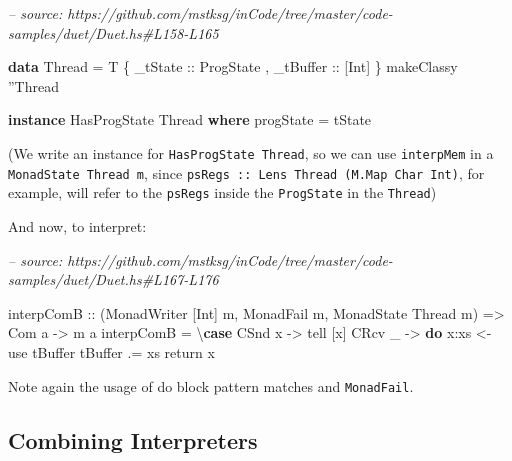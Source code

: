 \documentclass[]{article}
\newenvironment{Shaded}{}{}
\newcommand{\CommentTok}[1]{\textcolor[rgb]{0.38,0.63,0.69}{\textit{#1}}}
\newcommand{\DataTypeTok}[1]{\textcolor[rgb]{0.56,0.13,0.00}{#1}}
\newcommand{\FunctionTok}[1]{\textcolor[rgb]{0.02,0.16,0.49}{#1}}
\newcommand{\KeywordTok}[1]{\textcolor[rgb]{0.00,0.44,0.13}{\textbf{#1}}}
\newcommand{\NormalTok}[1]{#1}
\newcommand{\OtherTok}[1]{\textcolor[rgb]{0.00,0.44,0.13}{#1}}
\begin{document}
\begin{Shaded}
\begin{Highlighting}[]
\CommentTok{-- source: https://github.com/mstksg/inCode/tree/master/code-samples/duet/Duet.hs#L158-L165}

\KeywordTok{data} \DataTypeTok{Thread} \FunctionTok{=} \DataTypeTok{T}
\NormalTok{    \{}\OtherTok{ _tState   ::} \DataTypeTok{ProgState}
\NormalTok{    ,}\OtherTok{ _tBuffer  ::}\NormalTok{ [}\DataTypeTok{Int}\NormalTok{]}
\NormalTok{    \}}
\NormalTok{makeClassy ''}\DataTypeTok{Thread}

\KeywordTok{instance} \DataTypeTok{HasProgState} \DataTypeTok{Thread} \KeywordTok{where}
\NormalTok{    progState }\FunctionTok{=}\NormalTok{ tState}
\end{Highlighting}
\end{Shaded}

(We write an instance for \texttt{HasProgState\ Thread}, so we can use
\texttt{interpMem} in a \texttt{MonadState\ Thread\ m}, since
\texttt{psRegs\ ::\ Lens\textquotesingle{}\ Thread\ (M.Map\ Char\ Int)}, for
example, will refer to the \texttt{psRegs} inside the \texttt{ProgState} in the
\texttt{Thread})

And now, to interpret:

\begin{Shaded}
\begin{Highlighting}[]
\CommentTok{-- source: https://github.com/mstksg/inCode/tree/master/code-samples/duet/Duet.hs#L167-L176}

\NormalTok{interpComB}
\OtherTok{    ::}\NormalTok{ (}\DataTypeTok{MonadWriter}\NormalTok{ [}\DataTypeTok{Int}\NormalTok{] m, }\DataTypeTok{MonadFail}\NormalTok{ m, }\DataTypeTok{MonadState} \DataTypeTok{Thread}\NormalTok{ m)}
    \OtherTok{=>} \DataTypeTok{Com}\NormalTok{ a}
    \OtherTok{->}\NormalTok{ m a}
\NormalTok{interpComB }\FunctionTok{=}\NormalTok{ \textbackslash{}}\KeywordTok{case}
    \DataTypeTok{CSnd}\NormalTok{ x }\OtherTok{->}\NormalTok{ tell [x]}
    \DataTypeTok{CRcv}\NormalTok{ _ }\OtherTok{->} \KeywordTok{do}
\NormalTok{      x}\FunctionTok{:}\NormalTok{xs }\OtherTok{<-}\NormalTok{ use tBuffer}
\NormalTok{      tBuffer }\FunctionTok{.=}\NormalTok{ xs}
\NormalTok{      return x}
\end{Highlighting}
\end{Shaded}

Note again the usage of do block pattern matches and \texttt{MonadFail}.

\hypertarget{combining-interpreters}{%
\subsection{Combining Interpreters}\label{combining-interpreters}}
\end{document}
